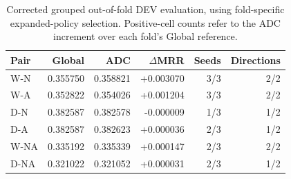 \begin{table}[htbp]
\centering\small
\caption{Corrected grouped out-of-fold DEV evaluation, using fold-specific expanded-policy selection. Positive-cell counts refer to the ADC increment over each fold's Global reference.}
\label{tab:rerun-dev}
\begin{tabular}{lrrrrr}
\toprule
Pair & Global & ADC & $\Delta$MRR & Seeds & Directions\\
\midrule
W-N & 0.355750 & 0.358821 & +0.003070 & 3/3 & 2/2\\
W-A & 0.352822 & 0.354026 & +0.001204 & 3/3 & 2/2\\
D-N & 0.382587 & 0.382578 & -0.000009 & 1/3 & 1/2\\
D-A & 0.382587 & 0.382623 & +0.000036 & 2/3 & 1/2\\
W-NA & 0.335192 & 0.335339 & +0.000147 & 2/3 & 2/2\\
D-NA & 0.321022 & 0.321052 & +0.000031 & 2/3 & 1/2\\
\bottomrule
\end{tabular}
\end{table}
